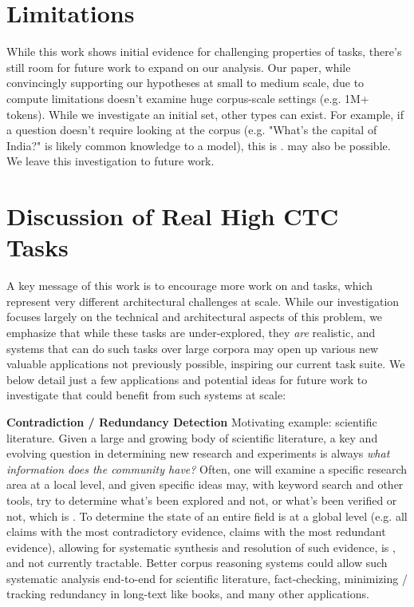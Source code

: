 
\section{Limitations}

While this work shows initial evidence for challenging properties of \cname tasks, there's still room for future work to expand on our analysis. Our paper, while convincingly supporting our hypotheses at small to medium scale, due to compute limitations doesn't examine huge corpus-scale settings (e.g. 1M+ tokens). While we investigate an initial set, other \cname types can exist. For example, if a question doesn't require looking at the corpus (e.g. "What's the capital of India?" is likely common knowledge to a model), this is .  may also be possible. We leave this investigation to future work.

\section{Discussion of Real High CTC Tasks}
\label{app:realism}

A key message of this work is to encourage more work on  and  tasks, which represent very different architectural challenges at scale. While our investigation focuses largely on the technical and architectural aspects of this problem, we emphasize that while these tasks are under-explored, they \emph{are} realistic, and systems that can do such tasks over large corpora may open up various new valuable applications not previously possible, inspiring our current task suite. We below detail just a few applications and potential ideas for future work to investigate that could benefit from such systems at scale:

\textbf{Contradiction / Redundancy Detection} Motivating example: scientific literature. Given a large and growing body of scientific literature, a key and evolving question in determining new research and experiments is always \emph{what information does the community have?} Often, one will examine a specific research area at a local level, and given specific ideas may, with keyword search and other tools, try to determine what's been explored and not, or what's been verified or not, which is . To determine the state of an entire field is at a global level (e.g. all claims with the most contradictory evidence, claims with the most redundant evidence), allowing for systematic synthesis and resolution of such evidence, is , and not currently tractable. Better corpus reasoning systems could allow such systematic analysis end-to-end for scientific literature, fact-checking, minimizing / tracking redundancy in long-text like books, and many other applications.

